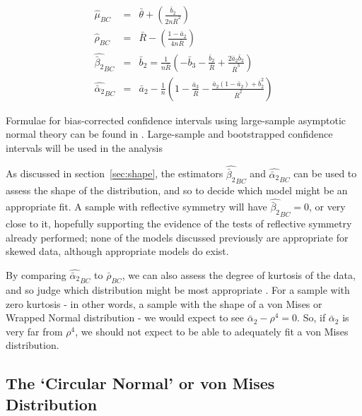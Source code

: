 \documentclass[../../ArchStats.tex]{subfiles}
\begin{document}
\begin{eqnarray*}
\hat{\mu}_{BC} &=& \bar{\theta} + \left(\frac{\bar{b}_2}{2n\bar{R}^2} \right)\\[5pt]
\hat{\rho}_{BC} &=& \bar{R} - \left(\frac{1-\bar{a}_2}{4n\bar{R}}\right)\\[5pt]
\widehat{\bar{\beta}_2}_{BC} &=& \bar{b}_2 = \frac{1}{n\bar{R}} \left(-\bar{b}_3 - \frac{\bar{b}_2}{\bar{R}} + \frac{2\bar{a}_2\bar{b}_2}{\bar{R}^3}\right)\\[5pt]
\widehat{\bar{\alpha}_2}_{BC} &=& \bar{a}_2 - \frac{1}{n} \left(1-\frac{\bar{a}_3}{\bar{R}}-\frac{\bar{a}_2(1-\bar{a}_2) + \bar{b}_2^2}{\bar{R}^2}\right)
\end{eqnarray*}

Formulae for bias-corrected confidence intervals using large-sample asymptotic normal theory can be found in \cite{Pewsey2014}. Large-sample and bootstrapped confidence intervals will be used in the analysis 

As discussed in section~\ref{sec:shape}, the estimators $\widehat{\bar{\beta}_2}_{BC}$  and $\widehat{\bar{\alpha}_2}_{BC}$ can be used to assess the shape of the distribution, and so to decide which model might be an appropriate fit. A sample with reflective symmetry will have $\widehat{\bar{\beta}_2}_{BC} = 0$, or very close to it, hopefully supporting the evidence of the tests of reflective symmetry already performed; none of the models discussed previously are appropriate for skewed data, although appropriate models do exist.

By comparing $\widehat{\bar{\alpha}_2}_{BC}$ to $\bar{\rho}_{BC}$, we can also assess the degree of kurtosis of the data, and so judge which distribution might be most appropriate . For a sample with zero kurtosis - in other words, a sample with the shape of a von Mises or Wrapped Normal distribution - we would expect to see $\bar{\alpha}_2 - \rho^4 = 0$. So, if $\bar{\alpha}_2$ is very far from $\rho^4$, we should not expect to be able to  adequately fit a von Mises distribution.




\subsection{The `Circular Normal' or von Mises Distribution}
\end{document}
